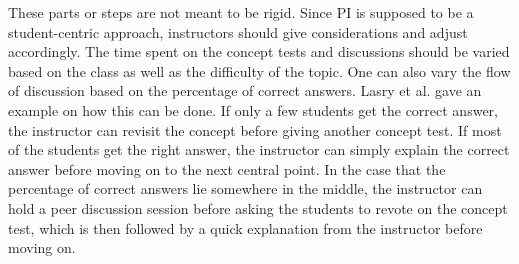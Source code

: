 These parts or steps are not meant to be rigid. Since PI is supposed to be a student-centric approach, instructors should give considerations and adjust accordingly. 
The time spent on the concept tests and discussions should be varied based on the class as well as the difficulty of the topic. 
One can also vary the flow of discussion based on the percentage of correct answers. 
Lasry et al. \cite{lasry2008peer} gave an example on how this can be done.
If only a few students get the correct answer, the instructor can revisit the concept before giving another concept test.
If most of the students get the right answer, the instructor can simply explain the correct answer before moving on to the next central point.
In the case that the percentage of correct answers lie somewhere in the middle, the instructor can hold a peer discussion session before asking the students to revote on the concept test, which is then followed by a quick explanation from the instructor before moving on.


